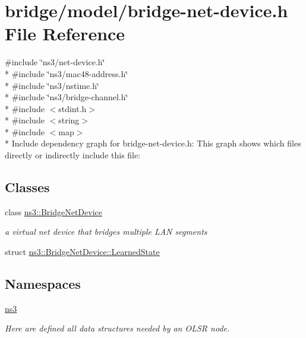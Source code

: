 \hypertarget{bridge-net-device_8h}{}\section{bridge/model/bridge-\/net-\/device.h File Reference}
\label{bridge-net-device_8h}
{\ttfamily \#include \char`\"{}ns3/net-\/device.\+h\char`\"{}}\\*
{\ttfamily \#include \char`\"{}ns3/mac48-\/address.\+h\char`\"{}}\\*
{\ttfamily \#include \char`\"{}ns3/nstime.\+h\char`\"{}}\\*
{\ttfamily \#include \char`\"{}ns3/bridge-\/channel.\+h\char`\"{}}\\*
{\ttfamily \#include $<$stdint.\+h$>$}\\*
{\ttfamily \#include $<$string$>$}\\*
{\ttfamily \#include $<$map$>$}\\*
Include dependency graph for bridge-\/net-\/device.h\+:
This graph shows which files directly or indirectly include this file\+:
\subsection*{Classes}
\begin{DoxyCompactItemize}
\item 
class \hyperlink{classns3_1_1BridgeNetDevice}{ns3\+::\+Bridge\+Net\+Device}
\begin{DoxyCompactList}\small\item\em a virtual net device that bridges multiple L\+AN segments \end{DoxyCompactList}\item 
struct \hyperlink{structns3_1_1BridgeNetDevice_1_1LearnedState}{ns3\+::\+Bridge\+Net\+Device\+::\+Learned\+State}
\end{DoxyCompactItemize}
\subsection*{Namespaces}
\begin{DoxyCompactItemize}
\item 
 \hyperlink{namespacens3}{ns3}
\begin{DoxyCompactList}\small\item\em Here are defined all data structures needed by an O\+L\+SR node. \end{DoxyCompactList}\end{DoxyCompactItemize}
